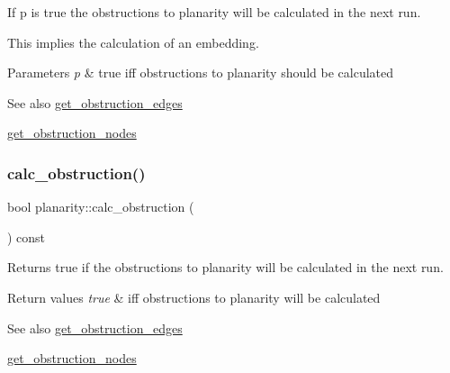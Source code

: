 If {\ttfamily p} is true the obstructions to planarity will be calculated in the next run. 

This implies the calculation of an embedding.


\begin{DoxyParams}{Parameters}
{\em p} & {\ttfamily true} iff obstructions to planarity should be calculated\\
\hline
\end{DoxyParams}
\begin{DoxySeeAlso}{See also}
\mbox{\hyperlink{classplanarity_ac9021696934cc24afbc36aa307b2919b}{get\+\_\+obstruction\+\_\+edges}} 

\mbox{\hyperlink{classplanarity_ac1bee50e38d398f3868a3308164caa31}{get\+\_\+obstruction\+\_\+nodes}} 
\end{DoxySeeAlso}
\mbox{\label{classplanarity_a0c520ff8f91336a2dc644f9e4ed8bb2e}} 
\subsubsection{\texorpdfstring{calc\+\_\+obstruction()}{calc\_obstruction()}\hspace{0.1cm}{\footnotesize\ttfamily [2/2]}}
{\footnotesize\ttfamily bool planarity\+::calc\+\_\+obstruction (\begin{DoxyParamCaption}{ }\end{DoxyParamCaption}) const\hspace{0.3cm}{\ttfamily [inline]}}



Returns true if the obstructions to planarity will be calculated in the next run. 


\begin{DoxyRetVals}{Return values}
{\em true} & iff obstructions to planarity will be calculated\\
\hline
\end{DoxyRetVals}
\begin{DoxySeeAlso}{See also}
\mbox{\hyperlink{classplanarity_ac9021696934cc24afbc36aa307b2919b}{get\+\_\+obstruction\+\_\+edges}} 

\mbox{\hyperlink{classplanarity_ac1bee50e38d398f3868a3308164caa31}{get\+\_\+obstruction\+\_\+nodes}} 
\end{DoxySeeAlso}
\mbox{\label{classplanarity_ae06c471d957a116aad14e338c341f8b1}} 

